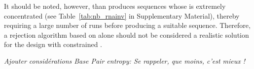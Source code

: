 It should be noted, however, than \RNAinverse produces sequences whose \GCContent is extremely concentrated (see Table~\ref{tab:nb_rnainv} in Supplementary Material), thereby requiring a large number of runs before producing a suitable \GCContent sequence. Therefore, a rejection algorithm based on \RNAinverse alone should not be considered a realistic solution for the design with constrained \GCContent. 

{\em Ajouter considérations Base Pair entropy: Se rappeler, que moins, c'est mieux !}











